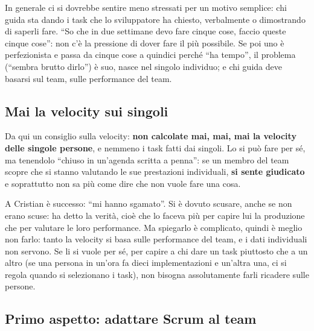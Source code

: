 In generale ci si dovrebbe sentire meno stressati per un motivo semplice: chi
guida sta dando i task che lo sviluppatore ha chiesto, verbalmente o dimostrando
di saperli fare. ``So che in due settimane devo fare cinque cose, faccio queste
cinque cose'': non c'è la pressione di dover fare il più possibile. Se poi uno è
perfezionista e passa da cinque cose a quindici perché ``ha tempo'', il problema
(``sembra brutto dirlo'') è suo, nasce nel singolo individuo; e chi guida deve
basarsi sul team, sulle performance del team.

\subsection{Mai la velocity sui singoli}

Da qui un consiglio sulla velocity: \textbf{non calcolate mai, mai, mai la
velocity delle singole persone}, e nemmeno i task fatti dai singoli. Lo si può
fare per sé, ma tenendolo ``chiuso in un'agenda scritta a penna'': se un membro
del team scopre che si stanno valutando le sue prestazioni individuali,
\textbf{si sente giudicato} e soprattutto non sa più come dire che non vuole
fare una cosa.

A Cristian è successo: ``mi hanno sgamato''. Si è dovuto scusare, anche se non
erano scuse: ha detto la verità, cioè che lo faceva più per capire lui la
produzione che per valutare le loro performance. Ma spiegarlo è complicato,
quindi è meglio non farlo: tanto la velocity si basa sulle performance del team,
e i dati individuali non servono. Se li si vuole per sé, per capire a chi dare
un task piuttosto che a un altro (se una persona in un'ora fa dieci
implementazioni e un'altra una, ci si regola quando si selezionano i task),
non bisogna assolutamente farli ricadere sulle persone.

\subsection{Primo aspetto: adattare Scrum al team}

